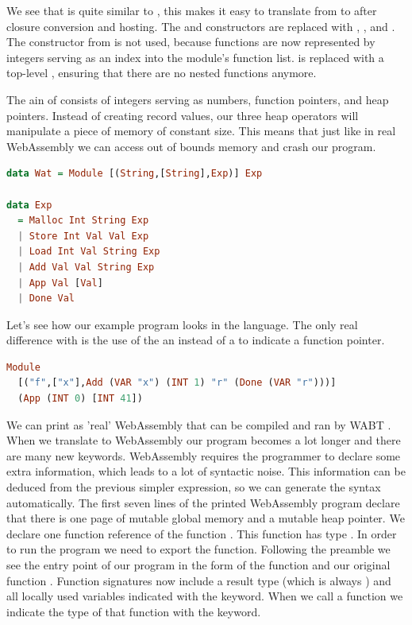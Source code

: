 {We see that  is quite similar to , this makes it easy to translate from  to  after closure conversion and hosting. The  and  constructors are replaced with , , and . The  constructor from  is not used, because functions are now represented by integers serving as an index into the module's function list.  is replaced with a top-level , ensuring that there are no nested functions anymore.

The ain of  consists of integers serving as numbers, function pointers, and heap pointers. Instead of creating record values, our three heap operators will manipulate a piece of memory of constant size. This means that just like in real WebAssembly we can access out of bounds memory and crash our program.

\begin{lstlisting}[language=Haskell]
data Wat = Module [(String,[String],Exp)] Exp

data Exp
  = Malloc Int String Exp
  | Store Int Val Val Exp
  | Load Int Val String Exp
  | Add Val Val String Exp
  | App Val [Val]
  | Done Val
\end{lstlisting}

Let's see how our example program looks in the  language. The only real difference with  is the use of the an  instead of a  to indicate a function pointer.

\begin{lstlisting}[language=Haskell]
Module 
  [("f",["x"],Add (VAR "x") (INT 1) "r" (Done (VAR "r")))]
  (App (INT 0) [INT 41])
\end{lstlisting}

We can print  as 'real' WebAssembly that can be compiled and ran by WABT \autocite{wabt}. When we translate to WebAssembly our program becomes a lot longer and there are many new keywords. WebAssembly requires the programmer to declare some extra information, which leads to a lot of syntactic noise. This information can be deduced from the previous simpler  expression, so we can generate the syntax automatically. The first seven lines of the printed WebAssembly program declare that there is one page of mutable global memory and a mutable heap pointer. We declare one function reference of the function . This function has type . In order to run the program we need to export the  function. Following the preamble we see the entry point of our program in the form of the function  and our original function . Function signatures now include a result type (which is always ) and all locally used variables indicated with the  keyword. When we call a function we indicate the type of that function with the  keyword.

}
